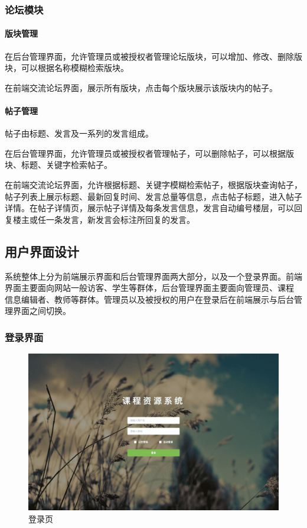 \documentclass[titlepage,UTF8,linespread=1.5]{ctexart}
\begin{document}
\subsubsection{论坛模块}
\paragraph{版块管理}
在后台管理界面，允许管理员或被授权者管理论坛版块，可以增加、修改、删除版块，可以根据名称模糊检索版块。\par
在前端交流论坛界面，展示所有版块，点击每个版块展示该版块内的帖子。\par
\paragraph{帖子管理}
帖子由标题、发言及一系列的发言组成。\par
在后台管理界面，允许管理员或被授权者管理帖子，可以删除帖子，可以根据版块、标题、关键字检索帖子。\par
在前端交流论坛界面，允许根据标题、关键字模糊检索帖子，根据版块查询帖子，帖子列表上展示标题、最新回复时间、发言总量等信息，点击帖子标题，进入帖子
详情。在帖子详情页，展示帖子详情及每条发言信息，发言自动编号楼层，可以回复楼主或任一条发言，新发言会标注所回复的发言。\par

\subsection{用户界面设计}
系统整体上分为前端展示界面和后台管理界面两大部分，以及一个登录界面。前端界面主要面向网站一般访客、学生等群体，后台管理界面主要面向管理员、课程
信息编辑者、教师等群体。管理员以及被授权的用户在登录后在前端展示与后台管理界面之间切换。\par
\subsubsection{登录界面}
\begin{figure}[H]
    \centering
    \includegraphics[width=140mm]{view-login.png}
    \caption{登录页}
    \label{fig:view-login}
\end{figure}
\end{document}
